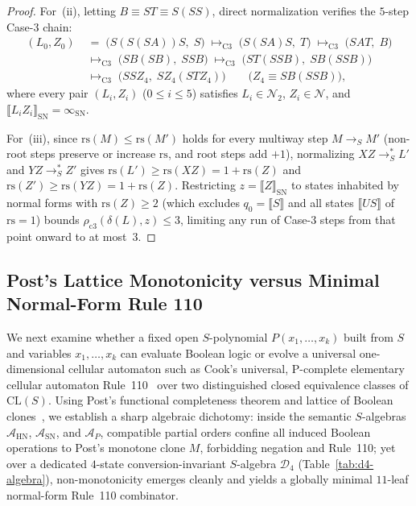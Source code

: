 \documentclass[11pt,reqno]{amsart}
\numberwithin{equation}{section}
\theoremstyle{plain}
\theoremstyle{definition}
\theoremstyle{remark}
\begin{document}
\begin{proof}
For~(ii), letting $B \equiv S T \equiv S(S S)$, direct normalization verifies the $5$-step Case-3 chain:
\begin{align*}
(L_0, Z_0) &\;=\; \bigl(S(S(S A)) S,\; S\bigr)
\;\mapsto_{\mathrm{C3}}\; \bigl(S(S A) S,\; T\bigr)
\;\mapsto_{\mathrm{C3}}\; \bigl(S A T,\; B\bigr) \\
&\;\mapsto_{\mathrm{C3}}\; \bigl(S B (S B),\; S S B\bigr)
\;\mapsto_{\mathrm{C3}}\; \bigl(S T (S S B),\; S B (S S B)\bigr) \\
&\;\mapsto_{\mathrm{C3}}\; \bigl(S S Z_4,\; S Z_4 (S T Z_4)\bigr)
\qquad \bigl(Z_4 \equiv S B (S S B)\bigr),
\end{align*}
where every pair $(L_i, Z_i)$ ($0 \le i \le 5$) satisfies $L_i \in \mathcal{N}_2$, $Z_i \in \mathcal{N}$, and $\llbracket L_i Z_i \rrbracket_{\mathrm{SN}} = \infty_{\mathrm{SN}}$.

For~(iii), since $\mathrm{rs}(M) \le \mathrm{rs}(M')$ holds for every multiway step $M \to_S M'$ (non-root steps preserve or increase $\mathrm{rs}$, and root steps add $+1$), normalizing $X Z \to_S^* L'$ and $Y Z \to_S^* Z'$ gives $\mathrm{rs}(L') \ge \mathrm{rs}(X Z) = 1 + \mathrm{rs}(Z)$ and $\mathrm{rs}(Z') \ge \mathrm{rs}(Y Z) = 1 + \mathrm{rs}(Z)$. Restricting $z = \llbracket Z \rrbracket_{\mathrm{SN}}$ to states inhabited by normal forms with $\mathrm{rs}(Z) \ge 2$ (which excludes $q_0 = \llbracket S \rrbracket$ and all states $\llbracket U S \rrbracket$ of $\mathrm{rs} = 1$) bounds $\rho_{\mathrm{c3}}(\delta(L), z) \le 3$, limiting any run of Case-3 steps from that point onward to at most~$3$.
\end{proof}

\subsection{Post's Lattice Monotonicity versus Minimal Normal-Form Rule 110}
\label{subsec:posts-lattice-rule110}

We next examine whether a fixed open $S$-polynomial $P(x_1, \dots, x_k)$ built from $S$ and variables $x_1, \dots, x_k$ can evaluate Boolean logic or evolve a universal one-dimensional cellular automaton such as Cook's universal, $\mathrm{P}$-complete elementary cellular automaton Rule~110~\cite{Cook2004Rule110,NearyWoods2006Rule110PComplete,Wolfram2002NKS} over two distinguished closed equivalence classes of $\mathrm{CL}(S)$. Using Post's functional completeness theorem and lattice of Boolean clones~\cite{Post1941}, we establish a sharp algebraic dichotomy: inside the semantic $S$-algebras $\mathcal{A}_{\mathrm{HN}}$, $\mathcal{A}_{\mathrm{SN}}$, and $\mathcal{A}_P$, compatible partial orders confine all induced Boolean operations to Post's monotone clone $M$, forbidding negation and Rule~110; yet over a dedicated $4$-state conversion-invariant $S$-algebra $\mathcal{D}_4$ (Table~\ref{tab:d4-algebra}), non-monotonicity emerges cleanly and yields a globally minimal $11$-leaf normal-form Rule~110 combinator.
\end{document}
